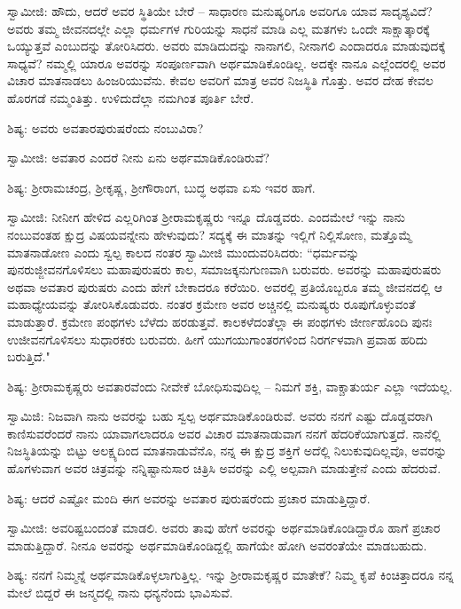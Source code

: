 ಸ್ವಾಮೀಜಿ: ಹೌದು, ಆದರೆ ಅವರ ಸ್ಥಿತಿಯೇ ಬೇರೆ – ಸಾಧಾರಣ ಮನುಷ್ಯರಿಗೂ ಅವರಿಗೂ ಯಾವ ಸಾದೃಶ್ಯವಿದೆ? ಅವರು ತಮ್ಮ ಜೀವನದಲ್ಲೇ ಎಲ್ಲಾ ಧರ್ಮಗಳ ಗುರಿಯನ್ನು ಸಾಧನೆ ಮಾಡಿ ಎಲ್ಲ ಮತಗಳು ಒಂದೇ ಸಾಕ್ಷಾತ್ಕಾರಕ್ಕೆ ಒಯ್ಯುತ್ತವೆ ಎಂಬುದನ್ನು ತೋರಿಸಿದರು. ಅವರು ಮಾಡಿದುದನ್ನು ನಾನಾಗಲಿ, ನೀನಾಗಲಿ ಎಂದಾದರೂ ಮಾಡುವುದಕ್ಕೆ ಸಾಧ್ಯವೆ? ನಮ್ಮಲ್ಲಿ ಯಾರೂ ಅವರನ್ನು ಸಂಪೂರ್ಣವಾಗಿ ಅರ್ಥಮಾಡಿಕೊಂಡಿಲ್ಲ. ಅದಕ್ಕೇ ನಾನೂ ಎಲ್ಲೆಂದರಲ್ಲಿ ಅವರ ವಿಚಾರ ಮಾತನಾಡಲು ಹಿಂಜರಿಯುವೆನು. ಕೇವಲ ಅವರಿಗೆ ಮಾತ್ರ ಅವರ ನಿಜಸ್ಥಿತಿ ಗೊತ್ತು. ಅವರ ದೇಹ ಕೇವಲ ಹೊರಗಡೆ ನಮ್ಮಂತಿತ್ತು. ಉಳಿದುದೆಲ್ಲಾ ನಮಗಿಂತ ಪೂರ್ತಿ ಬೇರೆ.

ಶಿಷ್ಯ: ಅವರು ಅವತಾರಪುರುಷರೆಂದು ನಂಬುವಿರಾ?

ಸ್ವಾಮೀಜಿ: ಅವತಾರ ಎಂದರೆ ನೀನು ಏನು ಅರ್ಥಮಾಡಿಕೊಂಡಿರುವೆ?

ಶಿಷ್ಯ: ಶ‍್ರೀರಾಮಚಂದ್ರ, ಶ‍್ರೀಕೃಷ್ಣ, ಶ‍್ರೀಗೌರಾಂಗ, ಬುದ್ಧ ಅಥವಾ ಏಸು ಇವರ ಹಾಗೆ.

ಸ್ವಾಮೀಜಿ: ನೀನೀಗ ಹೇಳಿದ ಎಲ್ಲರಿಗಿಂತ ಶ‍್ರೀರಾಮಕೃಷ್ಣರು ಇನ್ನೂ ದೊಡ್ಡವರು. ಎಂದಮೇಲೆ ಇನ್ನು ನಾನು ನಂಬುವಂತಹ ಕ್ಷುದ್ರ ವಿಷಯವನ್ನೇನು ಹೇಳುವುದು? ಸದ್ಯಕ್ಕೆ ಈ ಮಾತನ್ನು ಇಲ್ಲಿಗೆ ನಿಲ್ಲಿಸೋಣ, ಮತ್ತೊಮ್ಮೆ ಮಾತನಾಡೋಣ ಎಂದು ಸ್ವಲ್ಪ ಕಾಲದ ನಂತರ ಸ್ವಾಮೀಜಿ ಮುಂದುವರಿಸಿದರು: “ಧರ್ಮವನ್ನು ಪುನರುಜ್ಜೀವನಗೊಳಿಸಲು ಮಹಾಪುರುಷರು ಕಾಲ, ಸಮಾಜಕ್ಕನುಗುಣವಾಗಿ ಬರುವರು. ಅವರನ್ನು ಮಹಾಪುರುಷರು ಅಥವಾ ಅವತಾರ ಪುರುಷರು ಎಂದು ಹೇಗೆ ಬೇಕಾದರೂ ಕರೆಯಿರಿ. ಅವರಲ್ಲಿ ಪ್ರತಿಯೊಬ್ಬರೂ ತಮ್ಮ ಜೀವನದಲ್ಲಿ ಆ ಮಹಾಧ್ಯೇಯವನ್ನು ತೋರಿಸಿಕೊಡುವರು. ನಂತರ ಕ್ರಮೇಣ ಅವರ ಅಚ್ಚಿನಲ್ಲಿ ಮನುಷ್ಯರು ರೂಪುಗೊಳ್ಳುವಂತೆ ಮಾಡುತ್ತಾರೆ. ಕ್ರಮೇಣ ಪಂಥಗಳು ಬೆಳೆದು ಹರಡುತ್ತವೆ. ಕಾಲಕಳೆದಂತೆಲ್ಲಾ ಈ ಪಂಥಗಳು ಜೀರ್ಣಹೊಂದಿ ಪುನಃ ಉಜೀವನಗೊಳಿಸಲು ಸುಧಾರಕರು ಬರುವರು. ಹೀಗೆ ಯುಗಯುಗಾಂತರಗಳಿಂದ ನಿರರ್ಗಳವಾಗಿ ಪ್ರವಾಹ ಹರಿದು ಬರುತ್ತಿದೆ."

ಶಿಷ್ಯ: ಶ‍್ರೀರಾಮಕೃಷ್ಣರು ಅವತಾರವೆಂದು ನೀವೇಕೆ ಬೋಧಿಸುವುದಿಲ್ಲ – ನಿಮಗೆ ಶಕ್ತಿ, ವಾಕ್ಚಾತುರ್ಯ ಎಲ್ಲಾ ಇದೆಯಲ್ಲ.

ಸ್ವಾಮಿಜಿ: ನಿಜವಾಗಿ ನಾನು ಅವರನ್ನು ಬಹು ಸ್ವಲ್ಪ ಅರ್ಥಮಾಡಿಕೊಂಡಿರುವೆ. ಅವರು ನನಗೆ ಎಷ್ಟು ದೊಡ್ಡವರಾಗಿ ಕಾಣಿಸುವರೆಂದರೆ ನಾನು ಯಾವಾಗಲಾದರೂ ಅವರ ವಿಚಾರ ಮಾತನಾಡುವಾಗ ನನಗೆ ಹೆದರಿಕೆಯಾಗುತ್ತದೆ. ನಾನೆಲ್ಲಿ ನಿಜಸ್ಥಿತಿಯನ್ನು ಬಿಟ್ಟು ಅಲಕ್ಷ್ಯದಿಂದ ಮಾತನಾಡುವೆನೊ, ನನ್ನ ಈ ಕ್ಷುದ್ರ ಶಕ್ತಿಗೆ ಅದೆಲ್ಲಿ ನಿಲುಕುವುದಿಲ್ಲವೊ, ಅವರನ್ನು ಹೊಗಳುವಾಗ ಅವರ ಚಿತ್ರವನ್ನು ನನ್ನಿಷ್ಟಾನುಸಾರ ಚಿತ್ರಿಸಿ ಅವರನ್ನು ಎಲ್ಲಿ ಅಲ್ಪವಾಗಿ ಮಾಡುತ್ತೇನೆ ಎಂದು ಹೆದರುವೆ.

ಶಿಷ್ಯ: ಆದರೆ ಎಷ್ಟೋ ಮಂದಿ ಈಗ ಅವರನ್ನು ಅವತಾರ ಪುರುಷರೆಂದು ಪ್ರಚಾರ ಮಾಡುತ್ತಿದ್ದಾರೆ.

ಸ್ವಾಮೀಜಿ: ಅವರಿಷ್ಟಬಂದಂತೆ ಮಾಡಲಿ. ಅವರು ತಾವು ಹೇಗೆ ಅವರನ್ನು ಅರ್ಥಮಾಡಿಕೊಂಡಿದ್ದಾರೊ ಹಾಗೆ ಪ್ರಚಾರ ಮಾಡುತ್ತಿದ್ದಾರೆ. ನೀನೂ ಅವರನ್ನು ಅರ್ಥಮಾಡಿಕೊಂಡಿದ್ದಲ್ಲಿ ಹಾಗೆಯೇ ಹೋಗಿ ಅವರಂತೆಯೇ ಮಾಡಬಹುದು.

ಶಿಷ್ಯ: ನನಗೆ ನಿಮ್ಮನ್ನೆ ಅರ್ಥಮಾಡಿಕೊಳ್ಳಲಾಗುತ್ತಿಲ್ಲ. ಇನ್ನು ಶ‍್ರೀರಾಮಕೃಷ್ಣರ ಮಾತೇಕೆ? ನಿಮ್ಮ ಕೃಪೆ ಕಿಂಚಿತ್ತಾದರೂ ನನ್ನ ಮೇಲೆ ಬಿದ್ದರೆ ಈ ಜನ್ಮದಲ್ಲಿ ನಾನು ಧನ್ಯನೆಂದು ಭಾವಿಸುವೆ.

\newpage

